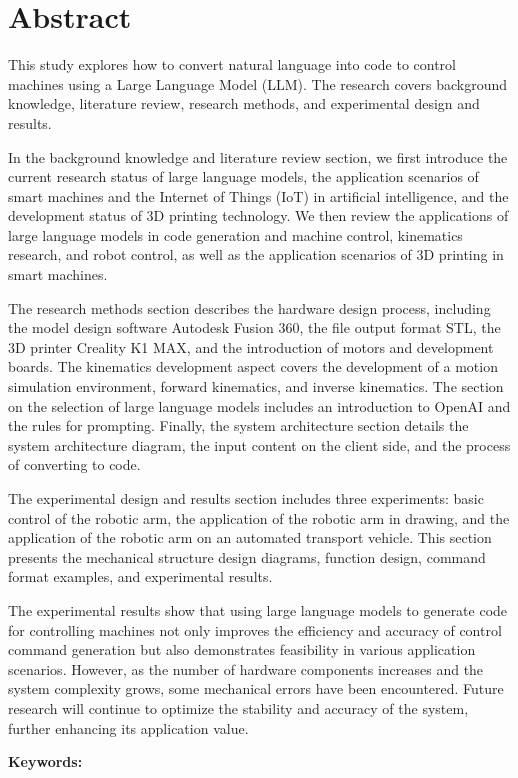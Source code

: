 \documentclass[class=NCU_thesis, crop=false]{standalone}
\begin{document}
\chapter{Abstract}

This study explores how to convert natural language into code to control machines using a Large Language Model (LLM). The research covers background knowledge, literature review, research methods, and experimental design and results.

In the background knowledge and literature review section, we first introduce the current research status of large language models, the application scenarios of smart machines and the Internet of Things (IoT) in artificial intelligence, and the development status of 3D printing technology. We then review the applications of large language models in code generation and machine control, kinematics research, and robot control, as well as the application scenarios of 3D printing in smart machines.

The research methods section describes the hardware design process, including the model design software Autodesk Fusion 360, the file output format STL, the 3D printer Creality K1 MAX, and the introduction of motors and development boards. The kinematics development aspect covers the development of a motion simulation environment, forward kinematics, and inverse kinematics. The section on the selection of large language models includes an introduction to OpenAI and the rules for prompting. Finally, the system architecture section details the system architecture diagram, the input content on the client side, and the process of converting to code.

The experimental design and results section includes three experiments: basic control of the robotic arm, the application of the robotic arm in drawing, and the application of the robotic arm on an automated transport vehicle. This section presents the mechanical structure design diagrams, function design, command format examples, and experimental results.

The experimental results show that using large language models to generate code for controlling machines not only improves the efficiency and accuracy of control command generation but also demonstrates feasibility in various application scenarios. However, as the number of hardware components increases and the system complexity grows, some mechanical errors have been encountered. Future research will continue to optimize the stability and accuracy of the system, further enhancing its application value.

\vspace{2em}
\noindent \textbf{Keywords:} \keywordsEn{} %
\end{document}
